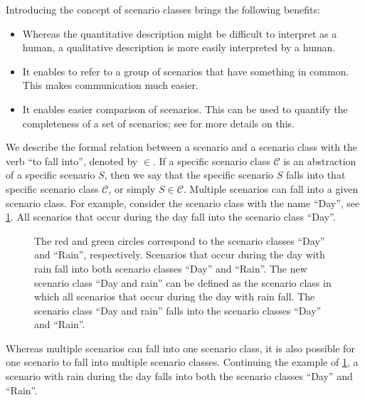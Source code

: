 Introducing the concept of scenario classes brings the following benefits:
\begin{itemize}
	\item Whereas the quantitative description might be difficult to interpret as a human, a qualitative description is more easily interpreted by a human.
	\item It enables to refer to a group of scenarios that have something in common. This makes communication much easier.
	\item It enables easier comparison of scenarios. This can be used to quantify the completeness of a set of scenarios; see \cite{degelder2019completeness} for more details on this.
\end{itemize}

We describe the formal relation between a scenario and a scenario class with the verb ``to fall into'', denoted by $\in$. If a specific scenario class $\mathcal{C}$ is an abstraction of a specific scenario $S$, then we say that the specific scenario $S$ falls into that specific scenario class $\mathcal{C}$, or simply $S \in \mathcal{C}$. Multiple scenarios can fall into a given scenario class. For example, consider the scenario class with the name ``Day'', see \cref{fig:venn diagram scenario class}. All scenarios that occur during the day fall into the scenario class ``Day''.

\setlength{\venncircle}{7em}
\begin{figure}
	\centering
	
	\caption{The red and green circles correspond to the scenario classes ``Day'' and ``Rain'', respectively. Scenarios that occur during the day with rain fall into both scenario classes ``Day'' and ``Rain''. The new scenario class ``Day and rain'' can be defined as the scenario class in which all scenarios that occur during the day with rain fall. The scenario class ``Day and rain'' falls into the scenario classes ``Day'' and ``Rain''.}
	\label{fig:venn diagram scenario class}
\end{figure}

Whereas multiple scenarios can fall into one scenario class, it is also possible for one scenario to fall into multiple scenario classes. Continuing the example of \cref{fig:venn diagram scenario class}, a scenario with rain during the day falls into both the scenario classes ``Day'' and ``Rain''.

